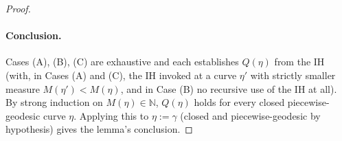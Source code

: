 \begin{proof}
  \paragraph{Conclusion.} Cases (A), (B), (C) are exhaustive and each establishes $Q(\eta)$ from the
  IH (with, in Cases (A) and (C), the IH invoked at a curve $\eta'$ with strictly smaller measure
  $M(\eta')<M(\eta)$, and in Case (B) no recursive use of the IH at all). By strong induction on
  $M(\eta)\in\mathbb{N}$, $Q(\eta)$ holds for every closed piecewise-geodesic curve $\eta$. Applying
  this to $\eta:=\gamma$ (closed and piecewise-geodesic by hypothesis) gives the lemma's conclusion.
\end{proof}
